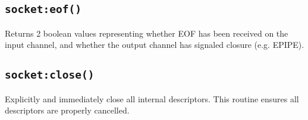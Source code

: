 \documentclass[11pt, oneside]{memoir}
\newcommand*{\fn}[1]{\texttt{#1}\xspace}
\begin{document}
\subsection[\fn{socket:eof}]{\fn{socket:eof()}}
Returns 2 boolean values representing whether EOF has been received on the input channel, and whether the output channel has signaled closure (e.g. EPIPE).

\subsection[\fn{socket:close}]{\fn{socket:close()}}
Explicitly and immediately close all internal descriptors. This routine ensures all descriptors are properly cancelled.








\appendix
\printindex
\end{document}
